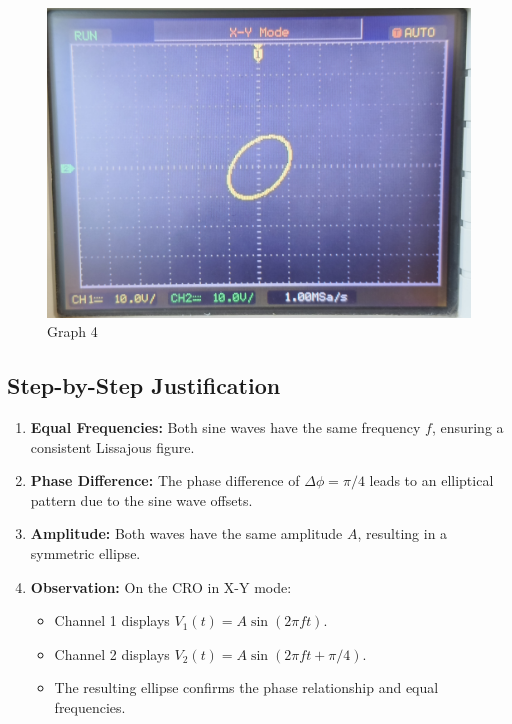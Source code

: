 \documentclass[12pt,a4paper]{report}
\begin{document}
\begin{figure}[H]
\begin{minipage}[c]{0.48\textwidth}
    \end{minipage}
    \hfill
    \begin{minipage}[c]{0.48\textwidth}
        \includegraphics[width=\textwidth]{figs/4cro.jpg} %
        
    \end{minipage}
    \caption{Graph 4}
    \label{fig:CRO-patterns}
\end{figure}


\subsection*{Step-by-Step Justification}
\begin{enumerate}
    \item \textbf{Equal Frequencies:} Both sine waves have the same frequency \(f\), ensuring a consistent Lissajous figure.
    \item \textbf{Phase Difference:} The phase difference of \(\Delta \phi = \pi/4\) leads to an elliptical pattern due to the sine wave offsets.
    \item \textbf{Amplitude:} Both waves have the same amplitude \(A\), resulting in a symmetric ellipse.
    \item \textbf{Observation:} On the CRO in X-Y mode:
    \begin{itemize}
        \item Channel 1 displays \(V_1(t) = A \sin(2 \pi f t)\).
        \item Channel 2 displays \(V_2(t) = A \sin(2 \pi f t + \pi/4)\).
        \item The resulting ellipse confirms the phase relationship and equal frequencies.
    \end{itemize}
\end{enumerate}
\end{document}
